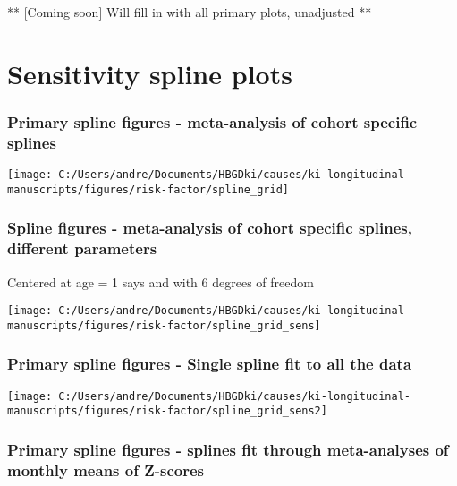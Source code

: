 \documentclass[
  9pt,
]{book}
\begin{document}
\raggedright

** {[}Coming soon{]} Will fill in with all primary plots, unadjusted **

\hypertarget{sens_splines}{%
\chapter{Sensitivity spline plots}\label{sens_splines}}

\raggedright

\hypertarget{primary-spline-figures---meta-analysis-of-cohort-specific-splines}{%
\subsection{Primary spline figures - meta-analysis of cohort specific splines}\label{primary-spline-figures---meta-analysis-of-cohort-specific-splines}}

\texttt{[image: C:/Users/andre/Documents/HBGDki/causes/ki-longitudinal-manuscripts/figures/risk-factor/spline\_grid]}

\hypertarget{spline-figures---meta-analysis-of-cohort-specific-splines-different-parameters}{%
\subsection{Spline figures - meta-analysis of cohort specific splines, different parameters}\label{spline-figures---meta-analysis-of-cohort-specific-splines-different-parameters}}

Centered at age = 1 says and with 6 degrees of freedom

\texttt{[image: C:/Users/andre/Documents/HBGDki/causes/ki-longitudinal-manuscripts/figures/risk-factor/spline\_grid\_sens]}

\hypertarget{primary-spline-figures---single-spline-fit-to-all-the-data}{%
\subsection{Primary spline figures - Single spline fit to all the data}\label{primary-spline-figures---single-spline-fit-to-all-the-data}}

\texttt{[image: C:/Users/andre/Documents/HBGDki/causes/ki-longitudinal-manuscripts/figures/risk-factor/spline\_grid\_sens2]}

\hypertarget{primary-spline-figures---splines-fit-through-meta-analyses-of-monthly-means-of-z-scores}{%
\subsection{Primary spline figures - splines fit through meta-analyses of monthly means of Z-scores}\label{primary-spline-figures---splines-fit-through-meta-analyses-of-monthly-means-of-z-scores}}
\end{document}
